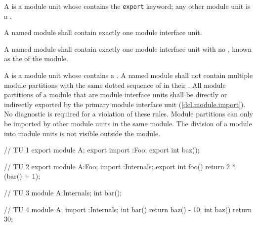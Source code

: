 \begin{std.txt}
\alinea
A  is a module unit whose
 contains the \texttt{export} keyword;
any other module unit is a .
\begin{before}\color{addclr}
A named module shall contain exactly one module interface unit.
\end{before}
\begin{after}\color{addclr}
A named module shall contain exactly one module interface unit
with no , known as the
 of the module.
\end{after}

\begin{after}\color{addclr}
\alinea
A  is
a module unit whose  contains
a .
A named module shall not contain multiple module partitions with
the same dotted sequence of  in their
.
All module partitions of a module
that are module interface units
shall be directly or indirectly exported
by the primary module interface unit (\ref{dcl.module.import}).
No diagnostic is required for a violation of these rules.
\enternote
Module partitions can only be imported by
other module units in the same module.
The division of a module into module units
is not visible outside the module.
\exitnote
\end{after}

\begin{after}\color{addclr}
\alinea
\begin{example}
\begin{codeblock}
// TU 1
export module A;
export import :Foo;
export int baz();
\end{codeblock}

\begin{codeblock}
// TU 2
export module A:Foo;
import :Internals;
export int foo() { return 2 * (bar() + 1); }
\end{codeblock}

\begin{codeblock}
// TU 3
module A:Internals;
int bar();
\end{codeblock}

\begin{codeblock}
// TU 4
module A;
import :Internals;
int bar() { return baz() - 10; }
int baz() { return 30; }
\end{codeblock}


\end{example}
\end{after}
\end{std.txt}
